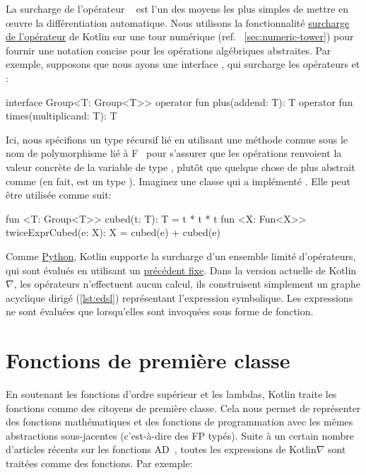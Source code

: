 La surcharge de l'opérateur \noindent~\citep{corliss1993operator} est l'un des moyens les plus simples de mettre en œuvre la différentiation automatique. Nous utilisons la fonctionnalité \href{https://kotlinlang.org/docs/reference/operator-overloading.html}{surcharge de l'opérateur} de Kotlin sur une tour numérique (ref. ~\autoref{sec:numeric-tower}) pour fournir une notation concise pour les opérations algébriques abstraites. Par exemple, supposons que nous ayons une interface , qui surcharge les opérateurs \inline{+} et \inline{*}:
%
\begin{kotlinlisting}
interface Group<T: Group<T>> {
    operator fun plus(addend: T): T
    operator fun times(multiplicand: T): T
}
\end{kotlinlisting}
%
Ici, nous spécifions un type récursif lié en utilisant une méthode connue sous le nom de polymorphisme lié à F~\citep{canning1989f} pour s'assurer que les opérations renvoient la valeur concrète de la variable de type , plutôt que quelque chose de plus abstrait comme  (en fait,  est un type ). Imaginez une classe  qui a implémenté . Elle peut être utilisée comme suit:
%
\begin{kotlinlisting}
fun <T: Group<T>> cubed(t: T): T = t * t * t
fun <X: Fun<X>> twiceExprCubed(e: X): X = cubed(e) + cubed(e)
\end{kotlinlisting}
%
Comme \href{https://docs.python.org/3/reference/datamodel.html#special-method-names}{Python}, Kotlin supporte la surcharge d'un ensemble limité d'opérateurs, qui sont évalués en utilisant un \href{https://kotlinlang.org/docs/reference/grammar.html#precedence}{précédent fixe}. Dans la version actuelle de Kotlin$\nabla$, les opérateurs n'effectuent aucun calcul, ils construisent simplement un graphe acyclique dirigé (\autoref{lst:edsl}) représentant l'expression symbolique. Les expressions ne sont évaluées que lorsqu'elles sont invoquées sous forme de fonction.

\section{Fonctions de première classe}\label{sec:first-class-functions}

En soutenant les fonctions d'ordre supérieur et les lambdas, Kotlin traite les fonctions comme des citoyens de première classe. Cela nous permet de représenter des fonctions mathématiques et des fonctions de programmation avec les mêmes abstractions sous-jacentes (c'est-à-dire des FP typés). Suite à un certain nombre d'articles récents sur les fonctions AD~\citep{pearlmutter2008reverse,wang2018backpropagation}, toutes les expressions de Kotlin$\nabla$ sont traitées comme des fonctions. Par exemple:

